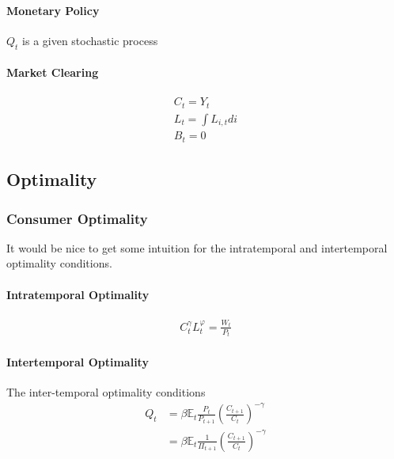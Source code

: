 \documentclass[10pt]{article}
\begin{document}
\paragraph{Monetary Policy}

$Q_t$ is a given stochastic process

\paragraph{Market Clearing}

\begin{align}
    C_t=Y_t \\
    L_t=\int L_{i, t} d i \\
    B_t=0
\end{align}


\subsection{Optimality}

\subsubsection{Consumer Optimality}

\color{red}

It would be nice to 
get some intuition 
for the intratemporal 
and intertemporal 
optimality conditions.

\color{black}

\paragraph{Intratemporal Optimality}

\begin{align}
    C_t^\gamma L_t^{\varphi}=\frac{W_t}{P_t}
\end{align}

\paragraph{Intertemporal Optimality}

The inter-temporal optimality conditions
$$
\begin{aligned}
Q_t & =\beta \mathbb{E}_t \frac{P_t}{P_{t+1}}\left(\frac{C_{t+1}}{C_t}\right)^{-\gamma} \\
& =\beta \mathbb{E}_t \frac{1}{\Pi_{t+1}}\left(\frac{C_{t+1}}{C_t}\right)^{-\gamma}
\end{aligned}
$$
\end{document}
